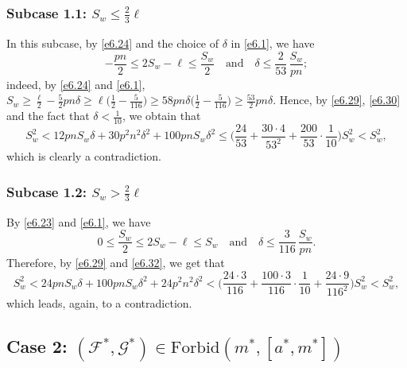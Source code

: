 \documentclass[10pt]{amsart}
\theoremstyle{remark}
\newcommand{\meg}{\geqslant}
\newcommand{\mik}{\leqslant}
\newcommand{\Fcal}{\mathcal{F}}
\newcommand{\Gcal}{\mathcal{G}}
\begin{document}
\subsubsection*{Subcase 1.1: $S_w\mik \frac23\ell$} In this subcase, by \eqref{e6.24} and the choice of
$\delta$ in \eqref{e6.1}, we have
\begin{equation} \label{e6.30}
-\frac{pn}{2}\mik 2S_w-\ell \mik \frac{S_w}{2} \ \ \ \text{ and } \ \ \
\delta \mik\frac{2}{53}\, \frac{S_w}{pn};
\end{equation}
indeed, by \eqref{e6.24} and \eqref{e6.1}, $S_w\meg \frac{\ell}{2}-\frac52 pn\delta\meg
\ell \big(\frac12- \frac{5}{116}\big) \meg 58pn\delta \big(\frac12- \frac{5}{116}\big)\meg
\frac{53}{2}pn\delta$. Hence, by \eqref{e6.29}, \eqref{e6.30} and the fact that $\delta<\frac{1}{10}$, we obtain that
\begin{equation} \label{e6.31}
S_w^2 < 12pnS_w\delta +30p^2n^2\delta^2 + 100pnS_w\delta^2
\mik \Big( \frac{24}{53}+ \frac{30\cdot 4}{53^2}+ \frac{200}{53}\cdot\frac{1}{10} \Big) S_w^2 < S_w^2,
\end{equation}
which is clearly a contradiction.

\subsubsection*{Subcase 1.2: $S_w>\frac23\ell$} By \eqref{e6.23} and \eqref{e6.1}, we have
\begin{equation} \label{e6.32}
0\mik \frac{S_w}{2} \mik 2S_w-\ell \mik S_w \ \ \ \text{ and } \ \ \
\delta \mik\frac{3}{116}\, \frac{S_w}{pn}.
\end{equation}
Therefore, by \eqref{e6.29} and \eqref{e6.32}, we get that
\begin{equation} \label{e6.33}
S_w^2 < 24pnS_w\delta +100pn S_w\delta^2 + 24 p^2n^2\delta^2
< \Big( \frac{24\cdot 3}{116}+ \frac{100\cdot 3}{116}\cdot \frac{1}{10}+ \frac{24\cdot 9}{116^2} \Big) S_w^2 < S_w^2,
\end{equation}
which leads, again, to a contradiction.

\subsection*{Case 2: $(\Fcal^*,\Gcal^*)\in\mathrm{Forbid}(m^*,[a^*,m^*])$}
\end{document}

